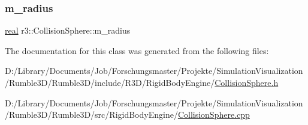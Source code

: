 \subsubsection{\texorpdfstring{m\+\_\+radius}{m\_radius}}
{\footnotesize\ttfamily \mbox{\hyperlink{namespacer3_ab2016b3e3f743fb735afce242f0dc1eb}{real}} r3\+::\+Collision\+Sphere\+::m\+\_\+radius\hspace{0.3cm}{\ttfamily [protected]}}



The documentation for this class was generated from the following files\+:\begin{DoxyCompactItemize}
\item 
D\+:/\+Library/\+Documents/\+Job/\+Forschungsmaster/\+Projekte/\+Simulation\+Visualization/\+Rumble3\+D/\+Rumble3\+D/include/\+R3\+D/\+Rigid\+Body\+Engine/\mbox{\hyperlink{_collision_sphere_8h}{Collision\+Sphere.\+h}}\item 
D\+:/\+Library/\+Documents/\+Job/\+Forschungsmaster/\+Projekte/\+Simulation\+Visualization/\+Rumble3\+D/\+Rumble3\+D/src/\+Rigid\+Body\+Engine/\mbox{\hyperlink{_collision_sphere_8cpp}{Collision\+Sphere.\+cpp}}\end{DoxyCompactItemize}
